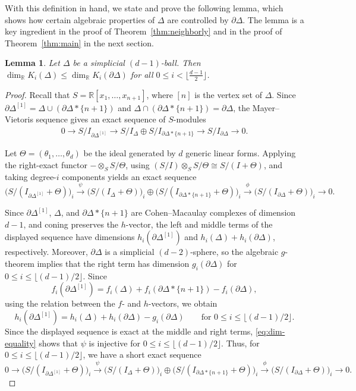 \documentclass[11pt]{article}
\newtheorem{lemma}[theorem]{Lemma}
\theoremstyle{definition}
\numberwithin{equation}{theorem}
\newcommand{\kk}{{\mathbb R}}
\begin{document}
With this definition in hand, we state and prove the following lemma, which shows how certain algebraic properties of $\Delta$ are controlled by $\partial\Delta$. The lemma is a key ingredient in the proof of Theorem~\ref{thm:neighborly} and in the proof of Theorem~\ref{thm:main} in the next section.

\begin{lemma}\label{lem:K_i} Let $\Delta$ be a simplicial $(d-1)$-ball. Then $\dim_\kk K_i(\Delta) \leq \dim_\kk K_i(\partial\Delta)$ for all $0\leq i < \lfloor \frac{d-1}{2}\rfloor$.
\end{lemma}
\begin{proof}
    Recall that $S=\kk[x_1,\ldots,x_{n+1}]$, where $[n]$ is the vertex set of $\Delta$. Since $\partial\Delta^{[1]}=\Delta\cup(\partial\Delta*\{n+1\})$ and $\Delta\cap(\partial\Delta*\{n+1\})=\partial\Delta$, the Mayer--Vietoris sequence gives an exact sequence of $S$-modules
    \begin{align*}
    0 \to S/I_{\partial \Delta^{[1]}} \to S/I_{\Delta} \oplus S/I_{\partial\Delta*\{n+1\}} \to S/I_{\partial \Delta} \to 0.
    \end{align*}
    
   Let $\Theta=(\theta_1,\ldots,\theta_d)$ be the ideal generated by $d$ generic linear forms. Applying the right-exact functor $-\otimes_S S/\Theta$, using $(S/I)\otimes_S S/\Theta\cong S/(I+\Theta)$, and taking degree-$i$ components yields an exact sequence
    $$
    \bigl(S/(I_{\partial \Delta^{[1]}}+\Theta)\bigr)_i \xrightarrow{\psi} \bigl(S/(I_{\Delta}+\Theta)\bigr)_i \oplus \bigl(S/(I_{\partial\Delta*\{n+1\}}+\Theta)\bigr)_i \xrightarrow{\phi} \bigl(S/(I_{\partial \Delta}+\Theta)\bigr)_i \to 0.
    $$

Since $\partial\Delta^{[1]}$, $\Delta$, and $\partial\Delta*\{n+1\}$ are Cohen--Macaulay complexes of dimension $d-1$, and coning preserves the $h$-vector, the left and middle terms of the displayed sequence have dimensions $h_i(\partial\Delta^{[1]})$ and $h_i(\Delta)+h_i(\partial\Delta)$, respectively. Moreover, $\partial\Delta$ is a simplicial $(d-2)$-sphere, so the algebraic $g$-theorem implies that the right term has dimension $g_i(\partial\Delta)$ for $0\le i\le\lfloor(d-1)/2\rfloor$. 
Since 
\[
f_i(\partial\Delta^{[1]})=f_i(\Delta)+f_i(\partial\Delta*\{n+1\})-f_i(\partial\Delta),
\]
using the relation between the $f$- and $h$-vectors, we obtain
\begin{equation}  \label{eq:dim-equality}
h_i(\partial\Delta^{[1]})=h_i(\Delta)+h_i(\partial\Delta)-g_i(\partial\Delta)  \qquad \text{for } 0\le i\le\lfloor(d-1)/2\rfloor.
\end{equation}
Since the displayed sequence is exact at the middle and right terms, \eqref{eq:dim-equality} shows that $\psi$ is injective for $0\le i\le\lfloor(d-1)/2\rfloor$. Thus, for $0\le i\le\lfloor(d-1)/2\rfloor$, we have a short exact sequence
\[
0\to \bigl(S/(I_{\partial\Delta^{[1]}}+\Theta)\bigr)_i \xrightarrow{\psi} \bigl(S/(I_{\Delta}+\Theta)\bigr)_i \oplus \bigl(S/(I_{\partial\Delta*\{n+1\}}+\Theta)\bigr)_i \xrightarrow{\phi} \bigl(S/(I_{\partial\Delta}+\Theta)\bigr)_i \to 0.
\]



\end{proof}
\end{document}

